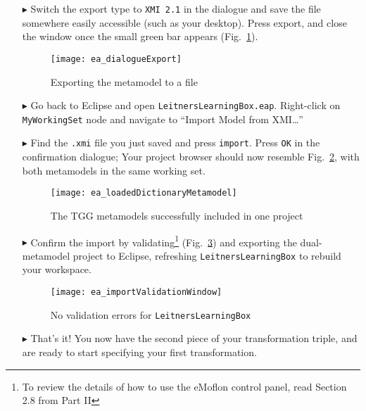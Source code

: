 \begin{itemize}
\item[$\blacktriangleright$] Switch the export type to \texttt{XMI 2.1} in the dialogue and save the file somewhere easily accessible (such as your desktop).
Press export, and close the window once the small green bar appears (Fig.~\ref{ea:export}).

\begin{figure}[htbp]
\begin{center}
  \texttt{[image: ea\_dialogueExport]}
  \caption{Exporting the metamodel to a file}
  \label{ea:export}
\end{center}
\end{figure}

\item[$\blacktriangleright$] Go back to Eclipse and open \texttt{LeitnersLearningBox.eap}. Right-click on \texttt{MyWorkingSet} node and navigate to ``Import
Model from XMI\ldots''

\item[$\blacktriangleright$] Find the \texttt{.xmi} file you just saved and press \texttt{import}. Press \texttt{OK} in the confirmation dialogue; Your project
browser should now resemble Fig.~\ref{ea:importProBrowser}, with both metamodels in the same working set.

\begin{figure}[htbp]
\begin{center}
  \texttt{[image: ea\_loadedDictionaryMetamodel]}
  \caption{The TGG metamodels successfully included in one project}
  \label{ea:importProBrowser}
\end{center}
\end{figure}

\clearpage

\item[$\blacktriangleright$] Confirm the import by validating\footnote{To review the details of how to use the eMoflon control panel, read Section 2.8 from
Part II} (Fig.~\ref{ea:importValidationWindow}) and exporting the dual-metamodel project to Eclipse, refreshing \texttt{LeitnersLearningBox} to rebuild your workspace. 

\begin{figure}[htbp]
\begin{center}
  \texttt{[image: ea\_importValidationWindow]}
  \caption{No validation errors for \texttt{LeitnersLearningBox}}
  \label{ea:importValidationWindow}
\end{center}
\end{figure}

\item[$\blacktriangleright$] That's it! You now have the second piece of your transformation triple, and are ready to start specifying your first
transformation.


\end{itemize}
